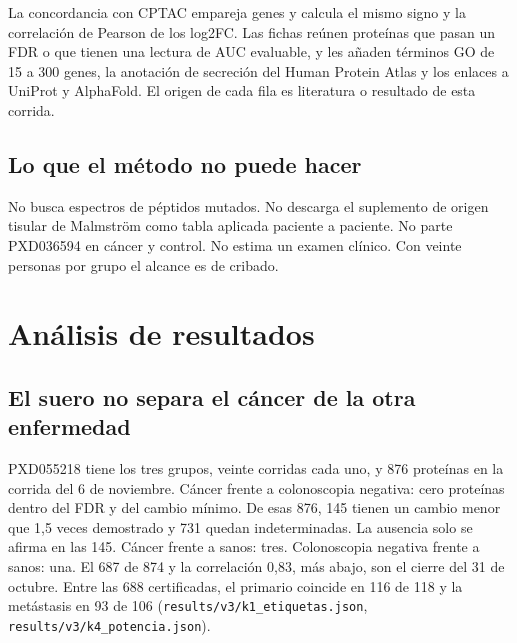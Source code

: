 \documentclass[12pt,oneside]{report}
\begin{document}
La concordancia con CPTAC empareja genes y calcula el mismo signo y la correlación de Pearson de los log2FC. Las fichas reúnen proteínas que pasan un FDR o que tienen una lectura de AUC evaluable, y les añaden términos GO de 15 a 300 genes, la anotación de secreción del Human Protein Atlas y los enlaces a UniProt y AlphaFold. El origen de cada fila es literatura o resultado de esta corrida.

\section{Lo que el método no puede hacer}
No busca espectros de péptidos mutados. No descarga el suplemento de origen tisular de Malmström como tabla aplicada paciente a paciente. No parte PXD036594 en cáncer y control. No estima un examen clínico. Con veinte personas por grupo el alcance es de cribado.

\chapter{Análisis de resultados}
\section{El suero no separa el cáncer de la otra enfermedad}
PXD055218 tiene los tres grupos, veinte corridas cada uno, y 876 proteínas en la corrida del 6 de noviembre. Cáncer frente a colonoscopia negativa: cero proteínas dentro del FDR y del cambio mínimo. De esas 876, 145 tienen un cambio menor que 1,5 veces demostrado y 731 quedan indeterminadas. La ausencia solo se afirma en las 145. Cáncer frente a sanos: tres. Colonoscopia negativa frente a sanos: una. El 687 de 874 y la correlación 0,83, más abajo, son el cierre del 31 de octubre. Entre las 688 certificadas, el primario coincide en 116 de 118 y la metástasis en 93 de 106 (\texttt{results/v3/k1\_etiquetas.json}, \texttt{results/v3/k4\_potencia.json}).
\end{document}
